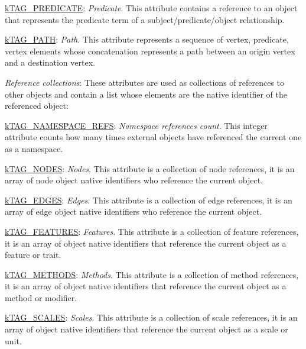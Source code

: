\begin{DoxyItemize}
\begin{DoxyItemize}
\item {\ttfamily \hyperlink{}{k\-T\-A\-G\-\_\-\-P\-R\-E\-D\-I\-C\-A\-T\-E}}\-: {\itshape Predicate}. This attribute contains a reference to an object that represents the predicate term of a {\ttfamily subject}/{\ttfamily predicate}/{\ttfamily object} relationship. 
\item {\ttfamily \hyperlink{}{k\-T\-A\-G\-\_\-\-P\-A\-T\-H}}\-: {\itshape Path}. This attribute represents a sequence of {\ttfamily vertex}, {\ttfamily predicate}, {\ttfamily vertex} elements whose concatenation represents a path between an origin vertex and a destination vertex. 
\end{DoxyItemize}
\item {\itshape Reference collections}\-: These attributes are used as collections of references to other objects and contain a list whose elements are the native identifier of the referenced object\-: 
\begin{DoxyItemize}
\item {\ttfamily \hyperlink{}{k\-T\-A\-G\-\_\-\-N\-A\-M\-E\-S\-P\-A\-C\-E\-\_\-\-R\-E\-F\-S}}\-: {\itshape Namespace references count}. This integer attribute counts how many times external objects have referenced the current one as a namespace. 
\item {\ttfamily \hyperlink{}{k\-T\-A\-G\-\_\-\-N\-O\-D\-E\-S}}\-: {\itshape Nodes}. This attribute is a collection of node references, it is an array of node object native identifiers who reference the current object. 
\item {\ttfamily \hyperlink{}{k\-T\-A\-G\-\_\-\-E\-D\-G\-E\-S}}\-: {\itshape Edges}. This attribute is a collection of edge references, it is an array of edge object native identifiers who reference the current object. 
\item {\ttfamily \hyperlink{}{k\-T\-A\-G\-\_\-\-F\-E\-A\-T\-U\-R\-E\-S}}\-: {\itshape Features}. This attribute is a collection of feature references, it is an array of object native identifiers that reference the current object as a feature or trait. 
\item {\ttfamily \hyperlink{}{k\-T\-A\-G\-\_\-\-M\-E\-T\-H\-O\-D\-S}}\-: {\itshape Methods}. This attribute is a collection of method references, it is an array of object native identifiers that reference the current object as a method or modifier. 
\item {\ttfamily \hyperlink{}{k\-T\-A\-G\-\_\-\-S\-C\-A\-L\-E\-S}}\-: {\itshape Scales}. This attribute is a collection of scale references, it is an array of object native identifiers that reference the current object as a scale or unit. 

\end{DoxyItemize}
\end{DoxyItemize}
